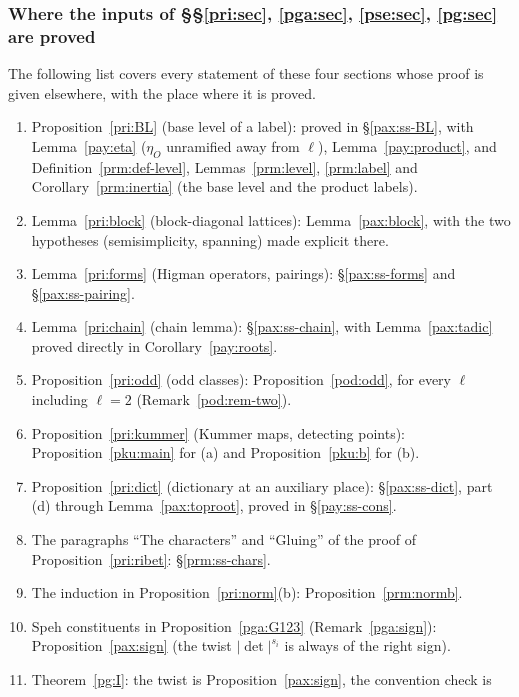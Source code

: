 \documentclass[10pt]{amsart}
\theoremstyle{definition}
\theoremstyle{remark}
\begin{document}
\subsubsection{Where the inputs of \S\S\ref{pri:sec}, \ref{pga:sec}, \ref{pse:sec}, \ref{pg:sec} are proved}
\label{prm:ss-blocks}

The following list covers every statement of these four sections whose proof is given elsewhere,
with the place where it is proved.

\begin{enumerate}
\item Proposition~\ref{pri:BL} (base level of a label): proved in \S\ref{pax:ss-BL}, with
Lemma~\ref{pay:eta} ($\eta_O$ unramified away from $\ell$), Lemma~\ref{pay:product}, and
Definition~\ref{prm:def-level}, Lemmas~\ref{prm:level}, \ref{prm:label} and
Corollary~\ref{prm:inertia} (the base level and the product labels).
\item Lemma~\ref{pri:block} (block-diagonal lattices): Lemma~\ref{pax:block}, with the two hypotheses
(semisimplicity, spanning) made explicit there.
\item Lemma~\ref{pri:forms} (Higman operators, pairings): \S\ref{pax:ss-forms} and
\S\ref{pax:ss-pairing}.
\item Lemma~\ref{pri:chain} (chain lemma): \S\ref{pax:ss-chain}, with Lemma~\ref{pax:tadic} proved
directly in Corollary~\ref{pay:roots}.
\item Proposition~\ref{pri:odd} (odd classes): Proposition~\ref{pod:odd}, for every $\ell$ including
$\ell=2$ (Remark~\ref{pod:rem-two}).
\item Proposition~\ref{pri:kummer} (Kummer maps, detecting points): Proposition~\ref{pku:main} for (a)
and Proposition~\ref{pku:b} for (b).
\item Proposition~\ref{pri:dict} (dictionary at an auxiliary place): \S\ref{pax:ss-dict}, part (d)
through Lemma~\ref{pax:toproot}, proved in \S\ref{pay:ss-cons}.
\item The paragraphs ``The characters'' and ``Gluing'' of the proof of Proposition~\ref{pri:ribet}:
\S\ref{prm:ss-chars}.
\item The induction in Proposition~\ref{pri:norm}(b): Proposition~\ref{prm:normb}.
\item Speh constituents in Proposition~\ref{pga:G123} (Remark~\ref{pga:sign}):
Proposition~\ref{pax:sign} (the twist $|\det|^{s_i}$ is always of the right sign).
\item Theorem~\ref{pg:I}: the twist is Proposition~\ref{pax:sign}, the convention check is

\end{enumerate}
\end{document}
